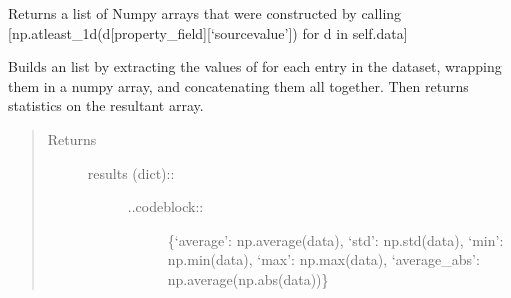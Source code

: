 \documentclass[letterpaper,10pt,english]{sphinxmanual}
\begin{document}
\begin{fulllineitems}
\begin{fulllineitems}
\begin{quote}
\begin{description}
\begin{itemize}
\end{itemize}

\end{description}\end{quote}

\sphinxAtStartPar
Returns a list of Numpy arrays that were constructed by calling
{[}np.atleast\_1d(d{[}property\_field{]}{[}‘source\sphinxhyphen{}value’{]}) for d in self.data{]}

\end{fulllineitems}


\begin{fulllineitems}
\label{\detokenize{dataset:colabfit.tools.dataset.Dataset.get_statistics}}
\sphinxAtStartPar
Builds an list by extracting the values of  for
each entry in the dataset, wrapping them in a numpy array, and
concatenating them all together. Then returns statistics on the
resultant array.
\begin{quote}\begin{description}
\item[{Returns}] \leavevmode
\sphinxAtStartPar
\begin{description}
\item[{results (dict)::}] \leavevmode\begin{description}
\item[{..code\sphinxhyphen{}block::}] \leavevmode
\sphinxAtStartPar
\{‘average’: np.average(data), ‘std’: np.std(data), ‘min’: np.min(data), ‘max’: np.max(data), ‘average\_abs’: np.average(np.abs(data))\}

\end{description}

\end{description}


\end{description}\end{quote}

\end{fulllineitems}


\begin{fulllineitems}
\label{\detokenize{dataset:colabfit.tools.dataset.Dataset.isdisjoint}}
\end{fulllineitems}


\end{fulllineitems}
\end{document}
